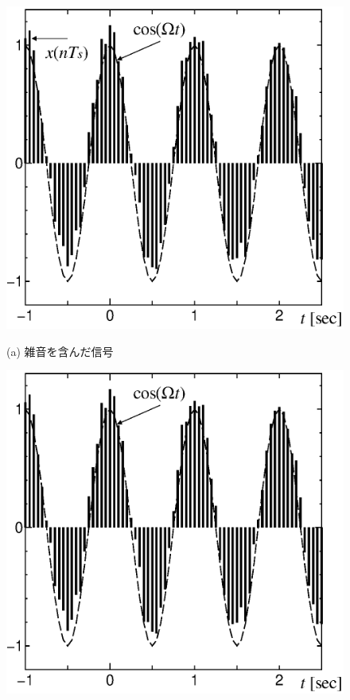 \begin{figure}[H]
\begin{center}
\begin{minipage}{.35\textwidth}
\begin{center}
\includegraphics[width=.85\textwidth]{fig/zu-2-2-a.eps}

(a) 雑音を含んだ信号
\end{center}
\end{minipage}
\begin{minipage}{.35\textwidth}
\begin{center}
\includegraphics[width=.85\textwidth]{fig/zu-2-2-b.eps}


\end{center}
\end{minipage}
\end{center}
\end{figure}
